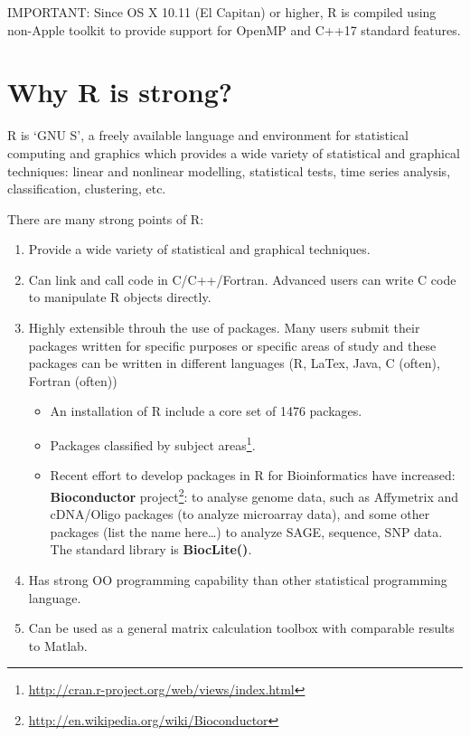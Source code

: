 IMPORTANT: Since OS X 10.11 (El Capitan) or higher,  R is compiled using
non-Apple toolkit to provide support for OpenMP and C++17 standard features.


\section{Why R is strong?}
\label{sec:why-r-strong}

R is ‘GNU S’, a freely available language and environment for statistical
computing and graphics which provides a wide variety of statistical and
graphical techniques: linear and nonlinear modelling, statistical tests, time
series analysis, classification, clustering, etc.

There are many strong points of R:
\begin{enumerate}
\item Provide a wide variety of statistical and graphical techniques.

\item Can link and call code in C/C++/Fortran. Advanced users can
  write C code to manipulate R objects directly.

\item Highly extensible throuh the use of packages. Many users submit
  their packages written for specific purposes or specific areas of
  study and these packages can be written in different languages (R,
  LaTex, Java, C (often), Fortran (often))
  \begin{itemize}
  \item An installation of R include a core set of 1476 packages.
  \item Packages classified by subject
  areas\footnote{\url{http://cran.r-project.org/web/views/index.html}}.
  \item Recent effort to develop packages in R for Bioinformatics have
  increased: {\bf Bioconductor}
  project\footnote{\url{http://en.wikipedia.org/wiki/Bioconductor}}:
  to analyse genome data, such as Affymetrix and cDNA/Oligo packages
  (to analyze microarray data), and some other packages (list the name
  here…) to analyze SAGE, sequence, SNP data. The standard library is
  {\bf BiocLite()}.
  \end{itemize}

\item Has strong OO programming capability than other statistical
  programming language.

\item Can be used as a general matrix calculation toolbox with
  comparable results to Matlab.
\end{enumerate}


